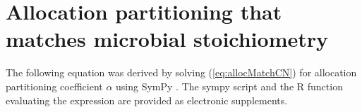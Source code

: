 \section{Allocation partitioning that matches microbial stoichiometry
\label{app:fAlphaFix}}

The following equation was derived by solving (\ref{eq:allocMatchCN}) for
allocation partitioning coefficient $\alpha$ using SymPy \citep{Sympy}. The
sympy script and the R function evaluating the expression are provided as
electronic supplements.


